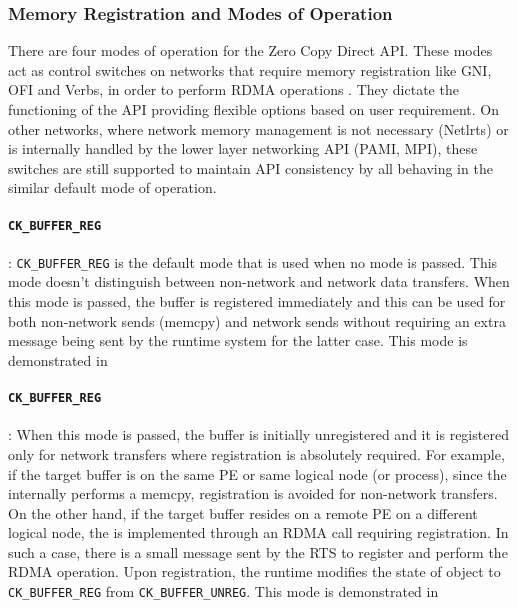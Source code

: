 \subsubsection{Memory Registration and Modes of Operation}

There are four modes of operation for the Zero Copy Direct API. These modes
act as control switches on networks that require memory registration like GNI,
OFI and Verbs, in order to perform RDMA operations . They dictate the functioning of the API
providing flexible options based on user requirement. On other networks, where
network memory management is not necessary (Netlrts) or is internally handled by the lower
layer networking API (PAMI, MPI), these switches are still supported to maintain API
consistency by all behaving in the similar default mode of operation.

\paragraph{{\tt CK\_BUFFER\_REG}}:
{\tt CK\_BUFFER\_REG} is the default mode that
is used when no mode is passed. This mode doesn't distinguish between
non-network and network data transfers. When this mode is passed, the buffer
is registered immediately and this can be used for both non-network sends (memcpy)
and network sends without requiring an extra message being sent by the runtime system
for the latter case. This mode is demonstrated in

\paragraph{{\tt CK\_BUFFER\_REG}}:
When this mode is passed, the buffer is initially unregistered and it is
registered only for network transfers where registration is absolutely required.
For example, if the target buffer is on the same PE or same logical node (or process),
since the  internally performs a memcpy, registration is avoided for non-network
transfers. On the other hand, if the target buffer resides on a remote PE on a different
logical node, the  is implemented through an RDMA call requiring registration.
In such a case, there is a small message sent by the RTS to register and perform
the RDMA operation. Upon registration, the runtime modifies the state of 
object to {\tt CK\_BUFFER\_REG} from {\tt CK\_BUFFER\_UNREG}. This mode is demonstrated in

